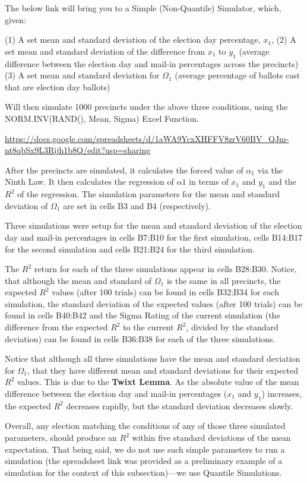 \documentclass[preprint,13pt]{elsarticle}
\begin{document}
The below link will bring you to a Simple (Non-Quantile) Simulator, which, given: 

(1) A set mean and standard deviation of the election day percentage, $x_{1}$, 
(2) A set mean and standard deviation of the difference from $x_{1}$ to $y_{1}$ (average difference between the election day and mail-in percentages across the precincts)
(3) A set mean and standard deviation for $\Omega_{1}$ (average percentage of ballots cast that are election day ballots)

Will then simulate 1000 precincts under the above three conditions, using the NORM.INV(RAND(), Mean, Sigma) Excel Function.

\url{https://docs.google.com/spreadsheets/d/1aWA9YcxXHFFV8zrV60BV_QJm-nt8qbSx9L3Rijh1b8Q/edit?usp=sharing}

After the precincts are simulated, it calculates the forced value of $\alpha_{1}$ via the Ninth Law. It then calculates the regression of $\alpha{1}$ in terms of $x_{1}$ and $y_{1}$ and the $R^2$ of the regression.  The simulation parameters for the mean and standard deviation of $\Omega_{1}$ are set in cells B3 and B4 (respectively).

Three simulations were setup for the mean and standard deviation of the election day and mail-in percentages in cells B7:B10 for the first simulation, cells B14:B17 for the second simulation and cells B21:B24 for the third simulation.

The $R^2$ return for each of the three simulations appear in cells B28:B30. Notice, that although the mean and standard of $\Omega_{1}$ is the same in all precincts, the expected $R^2$ values (after 100 trials) can be found in cells B32:B34 for each simulation, the standard deviation of the expected values (after 100 trials) can be found in cells B40:B42 and the Sigma Rating of the current simulation (the difference from the expected $R^2$ to the current $R^2$, divided by the standard deviation) can be found in cells B36:B38 for each of the three simulations.

Notice that although all three simulations have the mean and standard deviation for $\Omega_{1}$, that they have different mean and standard deviations for their expected $R^2$ values. This is due to the \textbf{Twixt Lemma}. As the absolute value of the mean difference between the election day and mail-in percentages ($x_{1}$ and $y_{1}$) increases, the expected $R^2$ decreases rapidly, but the standard deviation decreases slowly.

Overall, any election matching the conditions of any of those three simulated parameters, should produce an $R^2$ within five standard deviations of the mean expectation. 
\newpage
That being said, we do not use such simple parameters to run a simulation (the spreadsheet link was provided as a preliminary example of a simulation for the context of this subsection)---we use Quantile Simulations.
\end{document}
